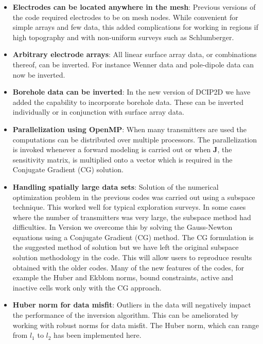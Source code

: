\begin{itemize}
\item \textbf{Electrodes can be located anywhere in the mesh}: Previous versions of the code required electrodes to be on mesh nodes. While convenient for simple arrays and few data, this added complications for working in regions if high topography and with non-uniform surveys such as Schlumberger. 

\item \textbf{Arbitrary electrode arrays}: All linear surface array data, or combinations thereof, can be inverted. For instance Wenner data and pole-dipole data can now be inverted. 

\item \textbf{Borehole data can be inverted}: In the new version of DCIP2D we have added the capability to incorporate borehole data. These can be inverted individually or in conjunction with surface array data.

\item \textbf{Parallelization using OpenMP}: When many transmitters are used the computations can be distributed over multiple processors. The parallelization is invoked whenever a forward modeling is carried out or when \textbf{J}, the sensitivity matrix, is multiplied onto a vector which is required in the Conjugate Gradient (CG) solution.

\item \textbf{Handling spatially large data sets}: Solution of the numerical optimization problem in the previous codes was carried out using a subspace technique. This worked well for typical exploration surveys. In some cases where the number of transmitters was very large, the subspace method had difficulties. In Version \version we overcome this by solving the Gauss-Newton equations using a Conjugate Gradient (CG) method. The CG formulation is the suggested method of solution but we have left the original subspace solution methodology in the code. This will allow users to reproduce results obtained with the older codes. Many of the new features of the codes, for example the Huber and Ekblom norms, bound constraints, active and inactive cells work only with the CG approach.

\item \textbf{Huber norm for data misfit}: Outliers in the data will negatively impact the performance of the inversion algorithm. This can be ameliorated by working with robust norms for data misfit. The Huber norm, which can range from $l_1$ to $l_2$ has been implemented here.


\end{itemize}
